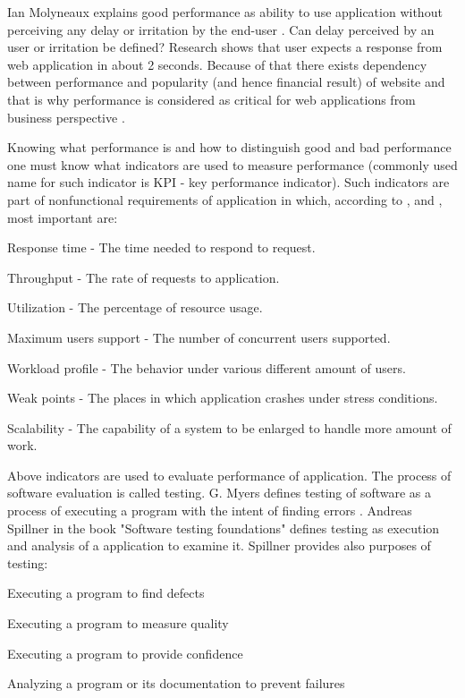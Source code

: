 \documentclass[12pt,a4paper]{article}
\let\tempone\itemize
\let\temptwo\enditemize
\renewenvironment{itemize}{\tempone\addtolength{\itemsep}{-0.4\baselineskip}}{\temptwo}
\begin{document}
Ian Molyneaux explains good performance as ability to use application without perceiving any delay or irritation by the end-user \cite{artperformance}. Can delay perceived by an user or irritation be defined? Research \cite{howlong} shows that user expects a response from web application in about 2 seconds. Because of that there exists dependency between performance and popularity (and hence financial result) of website and that is why performance is  considered as critical for web applications from business perspective \cite{architectingperformance}. 

Knowing what performance is  and how to distinguish good and bad performance one must know what indicators are used to measure performance (commonly used name for such indicator is KPI - key performance indicator). Such indicators are part of nonfunctional requirements of application in which, according to \cite{artperformance}, \cite{analysisofpet} and \cite{petmethodsandtools},  most important are:  
\begin{itemize}
\item Response time - The time needed to respond to request.
\item Throughput - The rate of requests to application.
\item Utilization - The percentage of resource usage.
\item Maximum users support - The number of concurrent users supported.
\item Workload profile - The behavior under various different amount of users.
\item Weak points - The places in which application crashes under stress conditions.
\item Scalability - The capability of a system to be enlarged to handle more amount of work.
\end{itemize}

Above indicators are used to evaluate performance of application. The process of software evaluation is called testing. G. Myers defines testing of software as a process of executing a program with the intent of finding errors \cite{arttest}. Andreas Spillner in the book "Software testing foundations" \cite{testfoundations} defines testing as execution and analysis of a application to examine it. Spillner provides also purposes of testing: 
\begin{itemize}
\item Executing a program to find defects
\item Executing a program to measure quality
\item Executing a program to provide confidence 
\item Analyzing a program or its documentation to prevent failures
\end{itemize}
\end{document}
